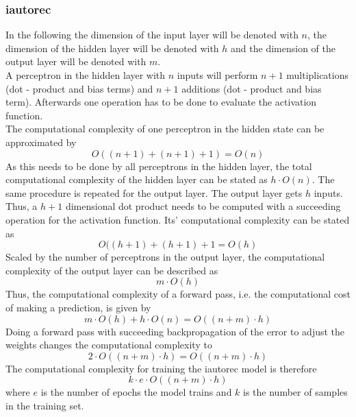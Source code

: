 \subsubsection{\acrshort{iautorec}}
In the following the dimension of the input layer will be denoted with $n$, the dimension of the hidden layer will be denoted with $h$ and the dimension of the output layer will be denoted with $m$.\\
A perceptron in the hidden layer with $n$ inputs will perform $n + 1$ multiplications (dot - product and bias terms) and $n + 1$ additions (dot - product and bias term). Afterwards one operation has to be done to evaluate the activation function.\\
The computational complexity of one perceptron in the hidden state can be approximated by\\
\begin{equation}
    O((n+1) + (n+1) + 1) = O(n)
\end{equation} 
As this needs to be done by all perceptrons in the hidden layer, the total computational complexity of the hidden layer can be stated as $h \cdot O(n)$. The same procedure is repeated for the output layer. The output layer gets $h$ inputs. Thus, a $h + 1$ dimensional dot product needs to be computed with a succeeding operation for the activation function. Its' computational complexity can be stated as\\
\begin{equation}
    O((h +1) + (h + 1) + 1 = O(h)
\end{equation}
Scaled by the number of perceptrons in the output layer, the computational complexity of the output layer can be described as\\
\begin{equation}
    m \cdot O(h)
\end{equation}
Thus, the computational complexity of a forward pass, i.e. the computational cost of making a prediction, is given by\\
\begin{equation}
    m \cdot O(h) + h \cdot O(n) = O((n + m) \cdot h)
\end{equation}
Doing a forward pass with succeeding backpropagation of the error to adjust the weights changes the computational complexity to\\
\begin{equation}
    2 \cdot O((n + m) \cdot h) = O((n + m) \cdot h)
\end{equation}
The computational complexity for training the \acrshort{iautorec} model is therefore\\
\begin{equation}
    k \cdot e \cdot O((n + m) \cdot h)
\end{equation}
where $e$ is the number of epochs the model trains and $k$ is the number of samples in the training set.

